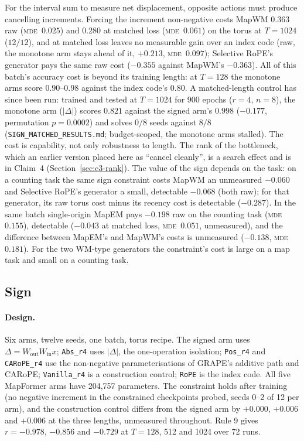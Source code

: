 \documentclass[10pt]{article}
\newcommand{\mde}{\textsc{mde}}
\newcommand{\arm}[1]{\texttt{#1}}
\begin{document}
For the interval sum to measure net displacement, opposite actions must produce cancelling increments.
Forcing the increment non-negative costs MapWM $0.363$
raw (\mde\ $0.025$) and $0.280$ at matched loss (\mde\ $0.061$) on the torus at $T=1024$ ($12/12$), and at
matched loss leaves no measurable gain over an index code (raw, the monotone arm stays ahead of it, $+0.213$,
\mde\ $0.097$); Selective RoPE's generator pays the same raw cost ($-0.355$ against MapWM's $-0.363$). All of
this batch's accuracy cost is beyond its training length: at $T=128$ the monotone arms score $0.90$--$0.98$ against the index
code's $0.80$. A matched-length control has since been run: trained and tested at $T=1024$ for $900$ epochs ($r=4$, $n=8$), the monotone arm ($|\Delta|$) scores $0.821$ against the signed arm's $0.998$ ($-0.177$, permutation $p=0.0002$) and solves $0/8$ seeds against $8/8$ (\texttt{SIGN\_MATCHED\_RESULTS.md}; budget-scoped, the monotone arms stalled). The cost is capability,
not only robustness to length. The rank of the
bottleneck, which an earlier version placed here as ``cancel cleanly'', is a search effect and is in
Claim~4 (Section~\ref{sec:c3-rank}). The value of the sign depends on the task: on a counting task the same sign constraint costs
MapWM an unmeasured $-0.060$ and Selective RoPE's generator a small, detectable $-0.068$ (both raw); for that
generator, its raw torus cost minus its recency cost is detectable ($-0.287$). In the same batch single-origin
MapEM pays $-0.198$ raw on the counting task (\mde\ $0.155$), detectable ($-0.043$ at matched loss, \mde\ $0.051$,
unmeasured), and the difference between MapEM's and MapWM's costs is unmeasured ($-0.138$, \mde\ $0.181$). For
the two WM-type generators the constraint's cost is large on a map task and small on a counting task.

\subsection{Sign}
\label{sec:c3-sign}

\paragraph{Design.} Six arms, twelve seeds, one batch, torus recipe. The signed arm uses
$\Delta=W_{\mathrm{out}}W_{\mathrm{in}}x$; \arm{Abs\_r4} uses $|\Delta|$, the one-operation isolation;
\arm{Pos\_r4} and \arm{CARoPE\_r4} use the non-negative parameterisations of GRAPE's additive
path and CARoPE; \arm{Vanilla\_r4} is a construction control; \arm{RoPE} is the index code. All five
MapFormer arms have 204,757 parameters. The constraint holds after training (no negative increment in
the constrained checkpoints probed, seeds 0--2 of 12 per arm), and the construction control differs from the signed arm by $+0.000$,
$+0.006$ and $+0.006$ at the three lengths, unmeasured throughout. Rule 9 gives $r=-0.978$, $-0.856$
and $-0.729$ at $T=128$, 512 and 1024 over 72 runs. %
\end{document}
